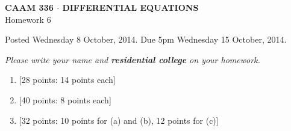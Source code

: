 \documentclass[10pt]{article}
\begin{document}
\vspace*{-5em}
\begin{center}
\large \textsf{\textbf{CAAM 336 $\cdot$ DIFFERENTIAL EQUATIONS}\\[0.5em]
Homework 6 }
\end{center}

Posted Wednesday 8 October, 2014.  Due 5pm Wednesday 15 October, 2014.
\begin{center}
\emph{Please write your name and \textbf{residential college} on your homework.}
\end{center}

\begin{enumerate}
\item {[28 points: 14 points each]}\\  
\newpage
\item {[40 points: 8 points each]}\\  
\newpage
\item {[32 points: 10 points for (a) and (b), 12 points for (c)]}\\  


\end{enumerate}
\end{document}
